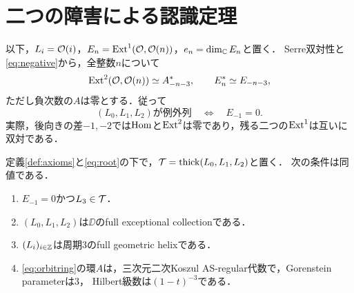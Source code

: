\documentclass[11pt,a4paper]{ltjsarticle}
\begin{document}
\section{二つの障害による認識定理}\label{sec:finite}
以下，$L_i=\mathcal O(i)$，$E_n=\operatorname{Ext}^1(\mathcal O,\mathcal O(n))$，$e_n=\dim_\mathbb C E_n$と置く．
Serre双対性と\eqref{eq:negative}から，全整数$n$について
\begin{equation}\label{eq:duality}
 \operatorname{Ext}^2(\mathcal O,\mathcal O(n))\simeq A_{-n-3}^{*},
 \qquad E_n^*\simeq E_{-n-3},
\end{equation}
ただし負次数の$A$は零とする．従って
\begin{equation}\label{eq:exceptionalcriterion}
 (L_0,L_1,L_2)\text{が例外列}\quad\Longleftrightarrow\quad E_{-1}=0.
\end{equation}
実際，後向きの差$-1,-2$では$\operatorname{Hom}$と$\operatorname{Ext}^2$は零であり，残る二つの$\operatorname{Ext}^1$は互いに双対である．

\begin{theorem}[固定した三乗根に対する有限判定]\label{thm:finite}
定義\ref{def:axioms}と\eqref{eq:root}の下で，$\mathcal T=\operatorname{thick}(L_0,L_1,L_2)$と置く．
次の条件は同値である．
\begin{enumerate}[label=(\roman*)]
\item $E_{-1}=0$かつ$L_3\in\mathcal T$．
\item $(L_0,L_1,L_2)$は$\DD$のfull exceptional collectionである．
\item $(L_i)_{i\in\mathbb Z}$は周期3のfull geometric helixである．
\item \eqref{eq:orbitring}の環$A$は，三次元二次Koszul AS-regular代数で，Gorenstein parameterは3，
Hilbert級数は$(1-t)^{-3}$である．
\end{enumerate}
\end{theorem}
\end{document}
